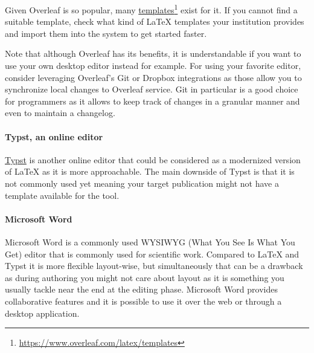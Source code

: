 Given Overleaf is so popular, many \href{https://www.overleaf.com/latex/templates}{templates}\footnote{\url{https://www.overleaf.com/latex/templates}} exist for it.
If you cannot find a suitable template, check what kind of LaTeX templates your institution provides and import them into the system to get started faster. %

Note that although Overleaf has its benefits, it is understandable if you want to use your own desktop editor instead for example.
For using your favorite editor, consider leveraging Overleaf's Git or Dropbox integrations as those allow you to synchronize local changes to Overleaf service. 
Git in particular is a good choice for programmers as it allows to keep track of changes in a granular manner and even to maintain a changelog.

\paragraph{Typst, an online editor}

\href{https://typst.app/}{Typst} is another online editor that could be considered as a modernized version of LaTeX as it is more approachable.
The main downside of Typst is that it is not commonly used yet meaning your target publication might not have a template available for the tool.

\paragraph{Microsoft Word}

Microsoft Word is a commonly used WYSIWYG (What You See Is What You Get) editor that is commonly used for scientific work.
Compared to LaTeX and Typst it is more flexible layout-wise, but simultaneously that can be a drawback as during authoring you might not care about layout as it is something you usually tackle near the end at the editing phase.
Microsoft Word provides collaborative features and it is possible to use it over the web or through a desktop application.

